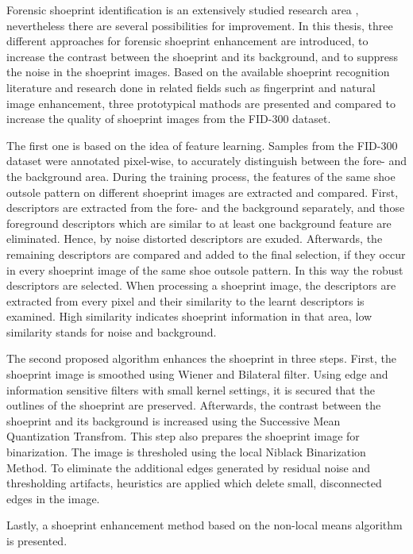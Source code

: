 \documentclass[draft,final]{vutinfth} %
\begin{document}
\par
Forensic shoeprint identification is an extensively studied research area \cite{rida2019forensic}, nevertheless there are several possibilities for improvement.
In this thesis, three different approaches for forensic shoeprint enhancement are introduced, to increase the contrast between the shoeprint and its background, and to suppress the noise in the shoeprint images.
Based on the available shoeprint recognition literature and research done in related fields such as fingerprint and natural image enhancement, three prototypical mathods are presented and compared to increase the quality of shoeprint images from the FID-300 dataset.
\par
The first one is based on the idea of feature learning.
Samples from the FID-300 dataset were annotated pixel-wise, to accurately distinguish between the fore- and the background area.
During the training process, the features of the same shoe outsole pattern on different shoeprint images are extracted and compared.
First, descriptors are extracted from the fore- and the background separately, and those foreground descriptors which are similar to at least one background feature are eliminated. 
Hence, by noise distorted descriptors are exuded.
Afterwards, the remaining descriptors are compared and added to the final selection, if they occur in every shoeprint image of the same shoe outsole pattern.
In this way the robust descriptors are selected.
When processing a shoeprint image, the descriptors are extracted from every pixel and their similarity to the learnt descriptors is examined.
High similarity indicates shoeprint information in that area, low similarity stands for noise and background.
\par
The second proposed algorithm enhances the shoeprint in three steps.
First, the shoeprint image is smoothed using Wiener and Bilateral filter.
Using edge and information sensitive filters with small kernel settings, it is secured that the outlines of the shoeprint are preserved.
Afterwards, the contrast between the shoeprint and its background is increased using the Successive Mean Quantization Transfrom.
This step also prepares the shoeprint image for binarization.
The image is thresholed using the local Niblack Binarization Method.
To eliminate the additional edges generated by residual noise and thresholding artifacts, heuristics are applied which delete small, disconnected edges in the image.
\par
Lastly, a shoeprint enhancement method based on the non-local means algorithm is presented.
\end{document}
